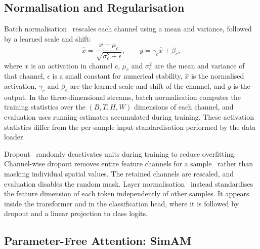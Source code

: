 \subsection{Normalisation and Regularisation}
\label{sec:normalisation}

Batch normalisation~\cite{ioffe2015} rescales each channel using a mean and variance, followed by a learned scale and shift:
\begin{equation}
	\widehat x=\frac{x-\mu_c}{\sqrt{\sigma_c^2+\epsilon}},
	\qquad y=\gamma_c\widehat x+\beta_c,
	\label{eq:batchnorm}
\end{equation}
where $x$ is an activation in channel $c$, $\mu_c$ and $\sigma_c^2$ are the mean and variance of that channel, $\epsilon$ is a small constant for numerical stability, $\widehat x$ is the normalised activation, $\gamma_c$ and $\beta_c$ are the learned scale and shift of the channel, and $y$ is the output. In the three-dimensional streams, batch normalisation computes the training statistics over the $(B,T,H,W)$ dimensions of each channel, and evaluation uses running estimates accumulated during training. These activation statistics differ from the per-sample input standardisation performed by the data loader.

Dropout~\cite{srivastava2014} randomly deactivates units during training to reduce overfitting. Channel-wise dropout removes entire feature channels for a sample~\cite{tompson2015} rather than masking individual spatial values. The retained channels are rescaled, and evaluation disables the random mask. Layer normalisation~\cite{ba2016} instead standardises the feature dimension of each token independently of other samples. It appears inside the transformer and in the classification head, where it is followed by dropout and a linear projection to class logits.

\subsection{Parameter-Free Attention: SimAM}
\label{sec:simam}

